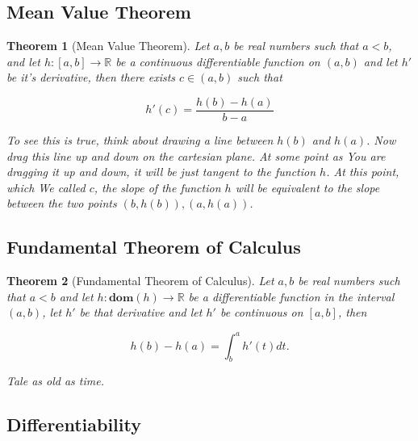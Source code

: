 \documentclass{article}
\newtheorem{theorem}{Theorem}[section]
\begin{document}
	\subsection{Mean Value Theorem}
	
		\begin{theorem}[Mean Value Theorem]
			Let $a, b$ be real numbers such that $a<b$, and let $h:[a, b]\to\mathbb{R}$ be a continuous differentiable function on $(a, b)$ and let $h'$ be it's derivative, then there exists $c\in (a, b)$ such that
			
			
			\[ h'(c) = \frac{h(b)-h(a)}{b-a} \]
			
			\textnormal{To see this is true, think about drawing a line between $h(b)$ and $h(a)$. Now drag this line up and down on the cartesian plane. At some point as You are dragging it up and down, it will be \textit{just} tangent to the function $h$. At this point, which We called $c$, the slope of the function $h$ will be equivalent to the slope between the two points $(b, h(b)), (a, h(a))$}.
			
		\end{theorem}
			
	\subsection{Fundamental Theorem of Calculus}
	
		\begin{theorem}[Fundamental Theorem of Calculus]
			Let $a, b$ be real numbers such that $a<b$ and let $h:\mathbf{dom}(h)\to\mathbb{R}$ be a differentiable function in the interval $(a, b)$, let $h'$ be that derivative and let $h'$ be continuous on $[a, b]$, then
			
			\[ h(b) - h(a) = \int^a_b h'(t) dt. \]
			
			\textnormal{Tale as old as time.}
		\end{theorem}
		
	\subsection{Differentiability}
	
\end{document}
